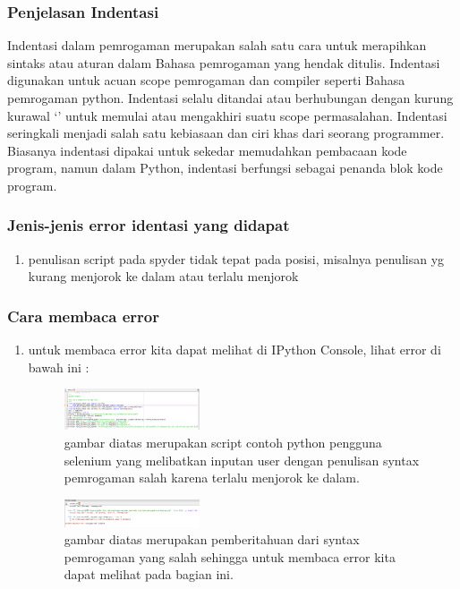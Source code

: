 \subsubsection{Penjelasan Indentasi}
Indentasi dalam pemrogaman merupakan salah satu cara untuk merapihkan sintaks atau aturan dalam Bahasa pemrogaman yang hendak ditulis. Indentasi digunakan untuk acuan scope pemrogaman dan compiler seperti Bahasa pemrogaman python. Indentasi selalu ditandai atau berhubungan dengan kurung kurawal ‘{}’ untuk memulai atau mengakhiri suatu scope permasalahan. Indentasi seringkali menjadi salah satu kebiasaan dan ciri khas dari seorang programmer. Biasanya indentasi dipakai untuk sekedar memudahkan pembacaan kode program, namun dalam Python, indentasi berfungsi sebagai penanda blok kode program.
\subsubsection{Jenis-jenis error identasi yang didapat}
\begin{enumerate}
	\item penulisan script pada spyder tidak tepat pada posisi, misalnya penulisan yg kurang menjorok ke dalam atau terlalu menjorok
\end{enumerate}
\subsubsection{Cara membaca error}
\begin{enumerate}
	\item untuk membaca error kita dapat melihat di IPython Console, lihat error di bawah ini :
	\begin{figure}[H]
		\includegraphics[width=4cm]{figures/1184065/ErrorSelenium1.PNG}
		\centering
		\caption{gambar diatas merupakan script contoh python pengguna selenium yang melibatkan inputan user dengan penulisan syntax pemrogaman salah karena terlalu menjorok ke dalam.}
	\end{figure}
	\begin{figure}[H]
		\includegraphics[width=4cm]{figures/1184065/PemberitahuanError1.PNG}
		\centering
		\caption{gambar diatas merupakan pemberitahuan dari syntax pemrogaman yang salah sehingga untuk membaca error kita dapat melihat pada bagian ini.}
		\end{figure}
\end{enumerate}
